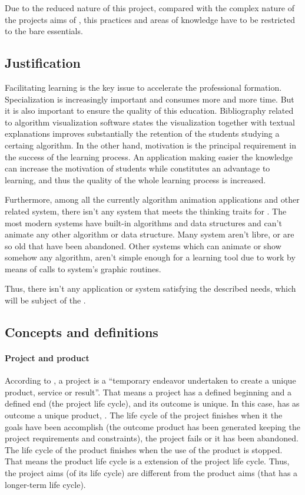 \documentclass[twocolumn]{article}
\begin{document}
Due to the reduced nature of this project, compared with the complex
nature of the projects aims of \pmbok, this practices and areas of
knowledge have to be restricted to the bare essentials.

\subsection{Justification}
Facilitating learning is the key issue to accelerate the professional
formation. Specialization is increasingly important and consumes more
and more time. But it is also important to ensure the quality of this
education. Bibliography related to algorithm visualization
software states the visualization together with textual explanations
improves substantially the retention of the students studying a
certaing algorithm. In the other hand, motivation is the
principal requirement in the success of the learning process. An
application making easier the knowledge can increase the motivation of
students while constitutes an advantage to learning, and thus the
quality of the whole learning process is increased.

Furthermore, among all the currently algorithm animation applications
and other related system, there isn't any system that meets the
thinking traits for \fav. The most modern systems have built-in
algorithms and data structures and can't animate any other algorithm
or data structure. Many system aren't libre, or are so old that have
been abandoned. Other systems which can animate or show somehow any
algorithm, aren't simple enough for a learning tool due to work by
means of calls to system's graphic routines.

Thus, there isn't any application or system satisfying the
described needs, which will be subject of the \favp.

\subsection{Concepts and definitions}
\paragraph{Project and product}
According to \pmbok, a project is a ``temporary endeavor undertaken to
create a unique product, service or result''. That means a project has
a defined beginning and a defined end (the project life cycle), and its outcome
is unique. In this case, \favp has as outcome a unique product,
\fav. The life cycle of the project finishes when it the goals have
been accomplish (the outcome product has been generated keeping the
project requirements and constraints), the project fails or it has
been abandoned. The life cycle of the product finishes when the use of
the product is stopped. That means the product life cycle is a
extension of the project life cycle. Thus, the project aims (of its
life cycle) are different from the product aims (that has a
longer-term life cycle).
\end{document}
